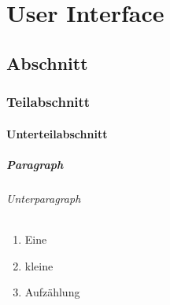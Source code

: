 
\chapter{User Interface}
\section{Abschnitt}
\subsection{Teilabschnitt}
\subsubsection{Unterteilabschnitt}
\paragraph{Paragraph}
\subparagraph{Unterparagraph}

\begin{enumerate}
     \item Eine
     \item kleine
     \item Aufzählung
\end{enumerate}

